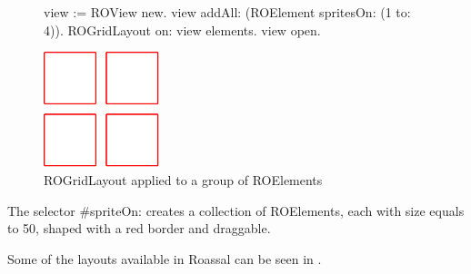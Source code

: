 \documentclass[a4paper,10pt,twoside]{book}
\begin{document}
\begin{figure}[H]
\label{fig:primerLayout}
      \begin{minipage}[t]{0.5\textwidth}
      \vspace{0pt}
     \begin{code}{}
view := ROView new.
view 
	addAll: (ROElement spritesOn: (1 to: 4)).
ROGridLayout on: view elements.
view open.
  \end{code}
   \end{minipage}
   \hfill
   \begin{minipage}[t]{0.6\textwidth}
      \vspace{0pt} \raggedright
       \centering
		\includegraphics[width=0.3\textwidth]{ROGrid2} %
   \end{minipage}

\caption{ROGridLayout applied to a group of ROElements}
\end{figure} 

The selector \#spriteOn: creates a collection of ROElements, each with size equals to 50, shaped with a red border and draggable.

Some of the layouts available in Roassal can be seen in .
\end{document}

